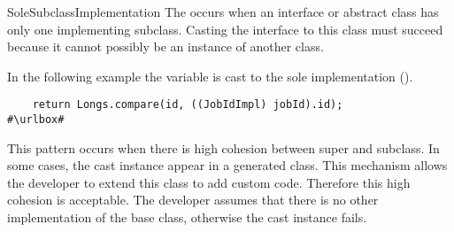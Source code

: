 \begin{pattern}{SoleSubclassImplementation}
The \thisp{} occurs when an interface or abstract class has only one implementing subclass.
Casting the interface to this class must succeed because it cannot possibly be an instance of another class.

\instances{}
In the following example%
\def\urlvar{http://bit.ly/ow2_proactive_scheduling_2Ulcjfs}
the  variable is cast to the sole implementation ().

\begin{verbatim}
    return Longs.compare(id, ((JobIdImpl) jobId).id);
#\urlbox#
\end{verbatim}



\issues{}
This pattern occurs when there is high cohesion between super and subclass.
In some cases, the cast instance appear in a generated class.
This mechanism allows the developer to extend this class to add custom code.
Therefore this high cohesion is acceptable.
The developer assumes that there is no other implementation of the base class,
otherwise the cast instance fails.

\end{pattern}

